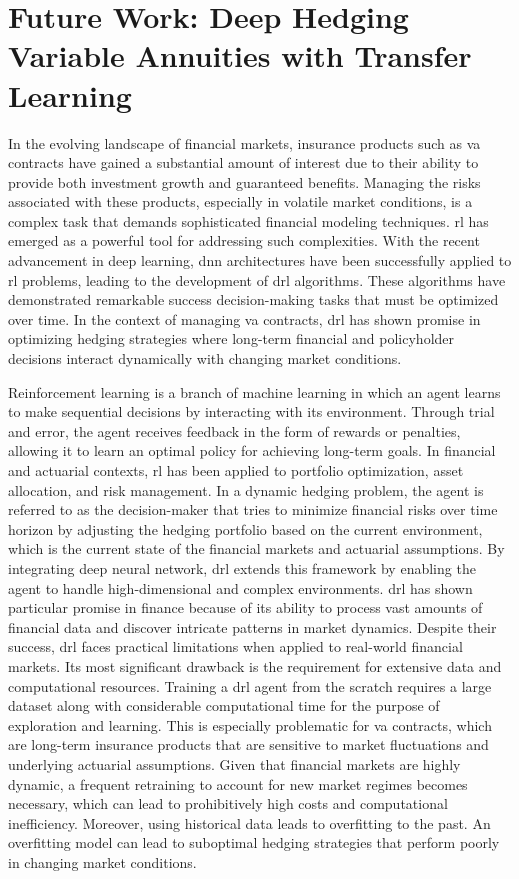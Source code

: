 \chapter{Future Work: Deep Hedging Variable Annuities with Transfer Learning} \label{chap:futureWork}

In the evolving landscape of financial markets, insurance products such as \gls{va} contracts have gained a substantial amount of interest due to their ability to provide both investment growth and guaranteed benefits. 
Managing the risks associated with these products, especially in volatile market conditions, is a complex task that demands sophisticated financial modeling techniques. 
\gls{rl} has emerged as a powerful tool for addressing such complexities. With the recent advancement in deep learning, \gls{dnn} architectures have been successfully applied to \gls{rl} problems, leading to the development of \gls{drl} algorithms. 
These algorithms have demonstrated remarkable success decision-making tasks that must be optimized over time. 
In the context of managing \gls{va} contracts, \gls{drl} has shown promise in optimizing hedging strategies where long-term financial and policyholder decisions interact dynamically with changing market conditions.

Reinforcement learning is a branch of machine learning in which an agent learns to make sequential decisions by interacting with its environment. 
Through trial and error, the agent receives feedback in the form of rewards or penalties, allowing it to learn an optimal policy for achieving long-term goals. 
In financial and actuarial contexts, \gls{rl} has been applied to portfolio optimization, asset allocation, and risk management. 
In a dynamic hedging problem, the agent is referred to as the decision-maker that tries to minimize financial risks over time horizon by adjusting the hedging portfolio based on the current environment, which is the current state of the financial markets and actuarial assumptions.
By integrating deep neural network, \gls{drl} extends this framework by enabling the agent to handle high-dimensional and complex environments. 
\gls{drl} has shown particular promise in finance because of its ability to process vast amounts of financial data and discover intricate patterns in market dynamics.
Despite their success, \gls{drl} faces practical limitations when applied to real-world financial markets.
Its most significant drawback is the requirement for extensive data and computational resources.
Training a \gls{drl} agent from the scratch requires a large dataset along with considerable computational time for the purpose of exploration and learning.
This is especially problematic for \gls{va} contracts, which are long-term insurance products that are sensitive to market fluctuations and underlying actuarial assumptions.
Given that financial markets are highly dynamic, a frequent retraining to account for new market regimes becomes necessary, which can lead to prohibitively high costs and computational inefficiency.
Moreover, using historical data leads to overfitting to the past. 
An overfitting model can lead to suboptimal hedging strategies that perform poorly in changing market conditions.

